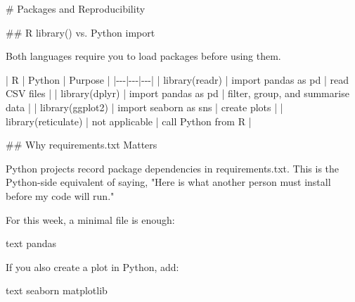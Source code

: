 \documentclass[
  letterpaper,
  DIV=11,
  numbers=noendperiod,
  oneside]{scrreprt}
\newenvironment{Shaded}{\begin{snugshade}}{\end{snugshade}}
\newcommand{\FunctionTok}[1]{\textcolor[rgb]{0.28,0.35,0.67}{#1}}
\newcommand{\InformationTok}[1]{\textcolor[rgb]{0.37,0.37,0.37}{#1}}
\newcommand{\NormalTok}[1]{\textcolor[rgb]{0.00,0.23,0.31}{#1}}
\newcommand{\PreprocessorTok}[1]{\textcolor[rgb]{0.68,0.00,0.00}{#1}}
\begin{document}
\begin{Shaded}
\begin{Highlighting}[numbers=left,,]
\FunctionTok{\# Packages and Reproducibility }


\FunctionTok{\#\# R \textasciigrave{}library()\textasciigrave{} vs. Python \textasciigrave{}import\textasciigrave{}}

\NormalTok{Both languages require you to load packages before using them.}

\PreprocessorTok{|}\NormalTok{ R }\PreprocessorTok{|}\NormalTok{ Python }\PreprocessorTok{|}\NormalTok{ Purpose }\PreprocessorTok{|}
\PreprocessorTok{|{-}{-}{-}|{-}{-}{-}|{-}{-}{-}|}
\PreprocessorTok{|} \InformationTok{\textasciigrave{}library(readr)\textasciigrave{}} \PreprocessorTok{|} \InformationTok{\textasciigrave{}import pandas as pd\textasciigrave{}} \PreprocessorTok{|}\NormalTok{ read CSV files }\PreprocessorTok{|}
\PreprocessorTok{|} \InformationTok{\textasciigrave{}library(dplyr)\textasciigrave{}} \PreprocessorTok{|} \InformationTok{\textasciigrave{}import pandas as pd\textasciigrave{}} \PreprocessorTok{|}\NormalTok{ filter, group, and summarise data }\PreprocessorTok{|}
\PreprocessorTok{|} \InformationTok{\textasciigrave{}library(ggplot2)\textasciigrave{}} \PreprocessorTok{|} \InformationTok{\textasciigrave{}import seaborn as sns\textasciigrave{}} \PreprocessorTok{|}\NormalTok{ create plots }\PreprocessorTok{|}
\PreprocessorTok{|} \InformationTok{\textasciigrave{}library(reticulate)\textasciigrave{}} \PreprocessorTok{|}\NormalTok{ not applicable }\PreprocessorTok{|}\NormalTok{ call Python from R }\PreprocessorTok{|}

\FunctionTok{\#\# Why \textasciigrave{}requirements.txt\textasciigrave{} Matters}

\NormalTok{Python projects record package dependencies in }\InformationTok{\textasciigrave{}requirements.txt\textasciigrave{}}\NormalTok{. This is the Python{-}side equivalent of saying, "Here is what another person must install before my code will run."}

\NormalTok{For this week, a minimal file is enough:}

\InformationTok{\textasciigrave{}\textasciigrave{}\textasciigrave{}text}
\InformationTok{pandas}
\InformationTok{\textasciigrave{}\textasciigrave{}\textasciigrave{}}

\NormalTok{If you also create a plot in Python, add:}

\InformationTok{\textasciigrave{}\textasciigrave{}\textasciigrave{}text}
\InformationTok{seaborn}
\InformationTok{matplotlib}
\InformationTok{\textasciigrave{}\textasciigrave{}\textasciigrave{}}


\end{Highlighting}
\end{Shaded}
\end{document}

